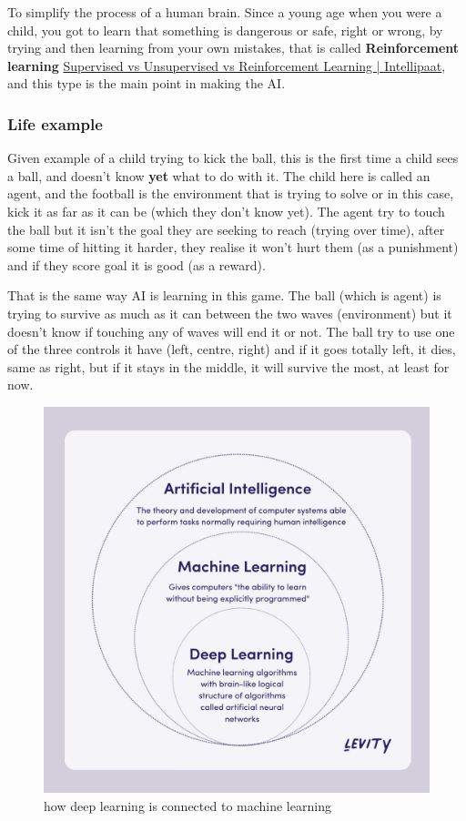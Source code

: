 To simplify the process of a human brain. Since a young age when you were a child, you got to learn that something is dangerous or safe, right or wrong, by trying and then learning from your own mistakes, that is called \textbf{Reinforcement learning} \href{https://intellipaat.com/blog/supervised-learning-vs-unsupervised-learning-vs-reinforcement-learning/}{Supervised vs Unsupervised vs Reinforcement Learning | Intellipaat}, and this type is the main point in making the AI.

\subsubsection{Life example}\label{sec:ai-life-example}
Given example of a child trying to kick the ball, this is the first time a child sees a ball, and doesn't know \textbf{yet} what to do with it. The child here is called an agent, and the football is the environment that is trying to solve or in this case, kick it as far as it can be (which they don't know yet). The agent try to touch the ball but it isn't the goal they are seeking to reach (trying over time), after some time of hitting it harder, they realise it won't hurt them (as a punishment) and if they score goal it is good (as a reward). 

That is the same way AI is learning in this game. The ball (which is agent) is trying to survive as much as it can between the two waves (environment) but it doesn't know if touching any of waves will end it or not. The ball try to use one of the three controls it have (left, centre, right) and if it goes totally left, it dies, same as right, but if it stays in the middle, it will survive the most, at least for now.

\begin{figure}[H]
	\centering
	\includegraphics[width=0.7\linewidth]{"usedImages/AI vs Machine Learning vs Deep Learning"}
	\caption{how deep learning is connected to machine learning}
	\label{fig:ai-vs-machine-learning-vs-deep-learning}
\end{figure}

